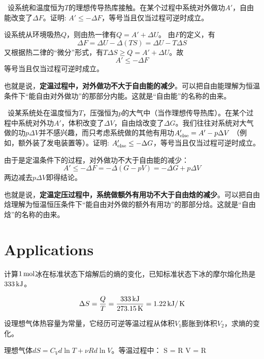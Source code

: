 \documentclass[CJK]{beamer}
\begin{document}
\begin{frame}
\bch
{\small
{\blue  设系统和温度恒为$T$的理想传导热库接触。在某个过程中系统对外做功$A'$，自由能改变了$\Delta F$。证明: $A'\le -\Delta F$，等号当且仅当过程可逆时成立。}

设系统从环境吸热$Q$，则由热一律有$Q = A' + \Delta U$。
由$F$的定义，有
$$\Delta F = \Delta U - \Delta (TS) = \Delta U - T\Delta S $$
又根据热二律的“微分”形式，有$T\Delta S \ge Q = A' +\Delta U$。故
$$A' \le - \Delta F$$
等号当且仅当过程可逆时成立。

也就是说，{\bf 定温过程中，对外做功不大于自由能的减少}。可以把自由能理解为恒温条件下“能自由对外做功”的那部分内能。这就是“自由能”的名称的由来。
}

\ech
\end{frame}

\begin{frame}
\bch

{\blue  设某系统处在温度恒为$T$，压强恒为$p$的大气中（当作理想传导热库）。在某个过程中系统对外功$A'$，体积改变了$\Delta V$，自由焓改变了$\Delta G$。我们往往对系统对大气做的功$p\Delta V$并不感兴趣，而只考虑系统做的其他有用功$A'_{\rm else} = A'-p\Delta V$ （例如，额外装了发电装置等）。证明: $A'_{\rm else}  \le -\Delta G$，等号当且仅当过程可逆时成立。}

由于是定温条件下的过程，对外做功不大于自由能的减少：
$$ A' \le - \Delta F = -\Delta (G- pV) = - \Delta G + p \Delta V$$
两边减去$p\Delta V$即得结论。

也就是说，{\bf 定温定压过程中，系统做额外有用功不大于自由焓的减少}。可以把自由焓理解为恒温恒压条件下“能自由对外做的额外有用功”的那部分焓。这就是“自由焓”的名称的由来。

\ech
\end{frame}

\section{Applications}

\begin{frame}
\bch
{计算$1\,\mathrm{mol}$冰在标准状态下熔解后的熵的变化，已知标准状态下冰的摩尔熔化热是$333\,\mathrm{kJ}$。}

\skipline
{
$$\Delta S = \frac{Q}{T} = \frac{333 \,\mathrm{kJ}}{273.15\,\mathrm{K}} = 1.22 \,\mathrm{kJ}/\,\mathrm{K} $$
}
\ech
\end{frame}


\begin{frame}
\bch
{\blue 设理想气体热容量为常量，它经历可逆等温过程从体积$V_1$膨胀到体积$V_2$，求熵的变化。}

\skipline

{
理想气体$dS = C_V d\ln T + \nu R d\ln V$。等温过程中：
\bea
\Delta S = \nu R \Delta \ln V = \nu R \ln{}
\eea
}
\ech
\end{frame}
\end{document}
